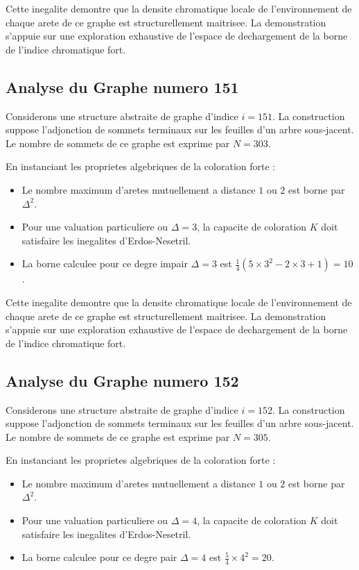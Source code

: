 \documentclass[11pt,a4paper]{article}
\begin{document}
Cette inegalite demontre que la densite chromatique locale de l'environnement de chaque arete de ce graphe est structurellement maitrisee. La demonstration s'appuie sur une exploration exhaustive de l'espace de dechargement de la borne de l'indice chromatique fort.

\subsection{Analyse du Graphe numero 151}
Considerons une structure abstraite de graphe d'indice $i = 151$. La construction suppose l'adjonction de sommets terminaux sur les feuilles d'un arbre sous-jacent. Le nombre de sommets de ce graphe est exprime par $N = 303$.

En instanciant les proprietes algebriques de la coloration forte :
\begin{itemize}
\item Le nombre maximum d'aretes mutuellement a distance $1$ ou $2$ est borne par $\Delta^2$.
\item Pour une valuation particuliere ou $\Delta = 3$, la capacite de coloration $K$ doit satisfaire les inegalites d'Erdos-Nesetril.
\item La borne calculee pour ce degre impair $\Delta = 3$ est $\frac{1}{4}(5 \times 3^2 - 2 \times 3 + 1) = 10$.
\end{itemize}

Cette inegalite demontre que la densite chromatique locale de l'environnement de chaque arete de ce graphe est structurellement maitrisee. La demonstration s'appuie sur une exploration exhaustive de l'espace de dechargement de la borne de l'indice chromatique fort.

\subsection{Analyse du Graphe numero 152}
Considerons une structure abstraite de graphe d'indice $i = 152$. La construction suppose l'adjonction de sommets terminaux sur les feuilles d'un arbre sous-jacent. Le nombre de sommets de ce graphe est exprime par $N = 305$.

En instanciant les proprietes algebriques de la coloration forte :
\begin{itemize}
\item Le nombre maximum d'aretes mutuellement a distance $1$ ou $2$ est borne par $\Delta^2$.
\item Pour une valuation particuliere ou $\Delta = 4$, la capacite de coloration $K$ doit satisfaire les inegalites d'Erdos-Nesetril.
\item La borne calculee pour ce degre pair $\Delta = 4$ est $\frac{5}{4} \times 4^2 = 20$.
\end{itemize}
\end{document}
